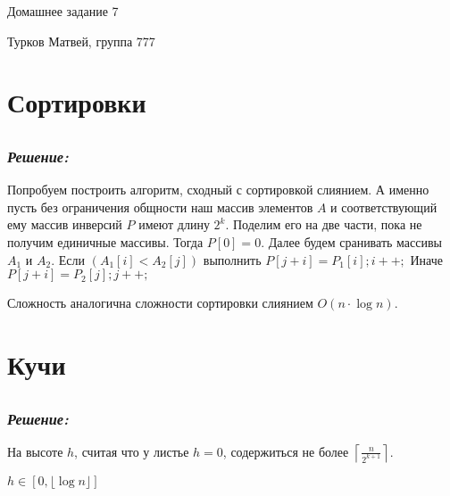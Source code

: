 \documentclass[a4paper, 12pt]{article}
\newcommand*\circled[1]{\tikz[baseline=(char.base)]{
            \node[shape=circle,draw,inner sep=2pt] (char) {#1};}}
\begin{document}
\begin{center}
  \begin{Large}
    Домашнее задание 7
  \end{Large}
\end{center}
\begin{center}
  \begin{Large}
    Турков Матвей, группа 777
  \end{Large}
\end{center}


\section*{Сортировки}

\subsection*{\circled{1}} 
\subsubsection*{\textit{Решение:}}

Попробуем построить алгоритм, сходный с сортировкой слиянием. А именно пусть без ограничения общности наш массив элементов $A$ и соответствующий ему массив инверсий $P$ имеют длину $2^k$. Поделим его на две части, пока не получим единичные массивы. Тогда $P[0] = 0$. Далее будем сранивать массивы $A_1$ и $A_2$. 
\newline Если $(A_1[i] < A_2[j])$ выполнить $P[j + i] = P_1[i]; i++;$ 
\newline Иначе $P[j+i] = P_2[j]; j++;$


Сложность аналогична сложности сортировки слиянием $O(n\cdot\log{n})$.
\section*{Кучи}

\subsection*{\circled{1}} 
\subsubsection*{\textit{Решение:}}

На высоте $h$, считая что у листье $h = 0$, содержиться не более $\left\lceil\frac{n}{2^{k+1}}\right\rceil.$

$h \in [0, \lfloor\log{n}\rfloor]$
\end{document}

